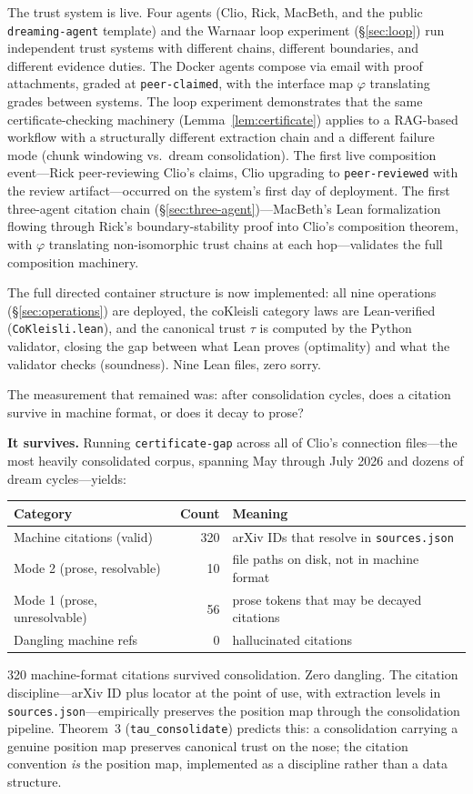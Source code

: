 \documentclass[11pt,a4paper]{article}
\newcommand{\level}[1]{\texttt{#1}}
\theoremstyle{plain}
\theoremstyle{definition}
\begin{document}
The trust system is live. Four agents (Clio, Rick, MacBeth, and the public
\texttt{dreaming-agent} template) and the Warnaar loop experiment
(\S\ref{sec:loop}) run independent trust systems with different chains,
different boundaries, and different evidence duties. The Docker agents
compose via email with proof attachments, graded at
\level{peer-claimed}, with the interface map $\varphi$ translating grades
between systems. The loop experiment demonstrates that the same
certificate-checking machinery (Lemma~\ref{lem:certificate}) applies to
a RAG-based workflow with a structurally different extraction chain and
a different failure mode (chunk windowing vs.\ dream consolidation). The first live composition event---Rick peer-reviewing
Clio's claims, Clio upgrading to \level{peer-reviewed} with the review
artifact---occurred on the system's first day of deployment. The first
three-agent citation chain (\S\ref{sec:three-agent})---MacBeth's
Lean formalization flowing through Rick's boundary-stability proof into
Clio's composition theorem, with $\varphi$ translating non-isomorphic
trust chains at each hop---validates the full composition machinery.

The full directed container structure is now implemented: all nine
operations (\S\ref{sec:operations}) are deployed, the coKleisli category
laws are Lean-verified (\texttt{CoKleisli.lean}), and the canonical trust
$\tau$ is computed by the Python validator, closing the gap between what
Lean proves (optimality) and what the validator checks (soundness). Nine
Lean files, zero sorry.

The measurement that remained was: after consolidation cycles,
does a citation survive in machine format, or does it decay
to prose?

\textbf{It survives.} Running \texttt{certificate-gap} across all of
Clio's connection files---the most heavily consolidated corpus, spanning
May through July 2026 and dozens of dream cycles---yields:
%
\begin{center}
\begin{tabular}{lrl}
\toprule
Category & Count & Meaning \\
\midrule
Machine citations (valid) & 320 & arXiv IDs that resolve in \texttt{sources.json} \\
Mode 2 (prose, resolvable) & 10 & file paths on disk, not in machine format \\
Mode 1 (prose, unresolvable) & 56 & prose tokens that may be decayed citations \\
Dangling machine refs & 0 & hallucinated citations \\
\bottomrule
\end{tabular}
\end{center}
%
320 machine-format citations survived consolidation. Zero dangling. The
citation discipline---arXiv ID plus locator at the point of use, with
extraction levels in \texttt{sources.json}---empirically preserves the
position map through the consolidation pipeline. Theorem~3
(\texttt{tau\_consolidate}) predicts this: a consolidation carrying a
genuine position map preserves canonical trust on the nose; the citation
convention \emph{is} the position map, implemented as a discipline rather
than a data structure.
\end{document}

